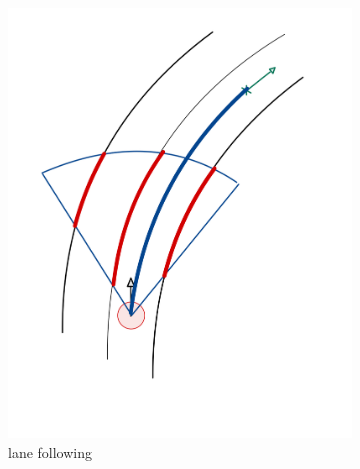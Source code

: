 \begin{figure}[H]
	\centering
	\begin{subfigure}{.3\linewidth}
		\includegraphics[width=\textwidth]{Pictures/lane following draw}
		\caption{lane following}
		\end{subfigure}	
	\begin{subfigure}{.3\linewidth}

\end{subfigure}
\end{figure}
